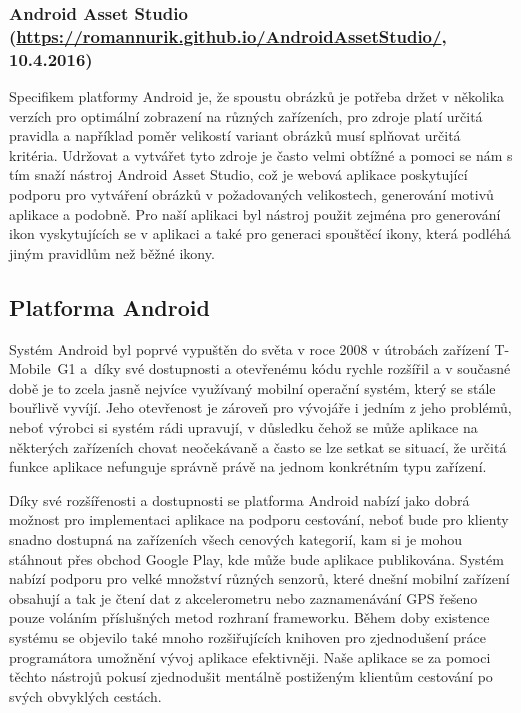 \documentclass[czech,master,public,dept460,male,java,cpdeclaration]{diploma}
\begin{document}
 \subsubsection{Android Asset Studio (\url{https://romannurik.github.io/AndroidAssetStudio/}, 10.4.2016)}
 Specifikem platformy Android je, že spoustu obrázků je potřeba držet v několika verzích pro optimální
 zobrazení na různých zařízeních, pro zdroje platí určitá pravidla a například poměr velikostí variant
 obrázků musí splňovat určitá kritéria. Udržovat a vytvářet tyto zdroje je často velmi obtížné
 a pomoci se nám s tím snaží nástroj Android Asset Studio, což je webová aplikace poskytující
 podporu pro vytváření obrázků v požadovaných velikostech, generování motivů aplikace a podobně.
 Pro naší aplikaci byl nástroj použit zejména pro generování ikon vyskytujících se v aplikaci
 a také pro generaci spouštěcí ikony, která podléhá jiným pravidlům než běžné ikony.


\subsection{Platforma Android}
Systém Android byl poprvé vypuštěn do světa v roce 2008 v útrobách zařízení T-Mobile~G1\cite{androidcentral}
a~díky své dostupnosti a otevřenému kódu rychle rozšířil a v současné době je to zcela jasně nejvíce využívaný mobilní
operační systém, který se stále bouřlivě vyvíjí. Jeho otevřenost je zároveň pro vývojáře i jedním z jeho problémů,
neboť výrobci si systém rádi upravují, v důsledku čehož se může aplikace na některých zařízeních chovat
neočekávaně a často se lze setkat se situací, že určitá funkce aplikace nefunguje správně právě na
jednom konkrétním typu zařízení.

Díky své rozšířenosti a dostupnosti se platforma Android nabízí jako dobrá možnost pro implementaci
aplikace na podporu cestování, neboť bude pro klienty snadno dostupná na zařízeních všech cenových
kategorií, kam si je mohou stáhnout přes obchod Google Play, kde může bude aplikace publikována.
Systém nabízí podporu pro velké množství různých senzorů, které dnešní mobilní zařízení obsahují
a tak je čtení dat z akcelerometru nebo zaznamenávání GPS řešeno pouze voláním příslušných metod
rozhraní frameworku. Během doby existence systému se objevilo také mnoho rozšiřujících knihoven
pro zjednodušení práce programátora umožnění vývoj aplikace efektivněji. Naše aplikace se
za pomoci těchto nástrojů pokusí zjednodušit mentálně postiženým klientům cestování po svých
obvyklých cestách.
\end{document}
